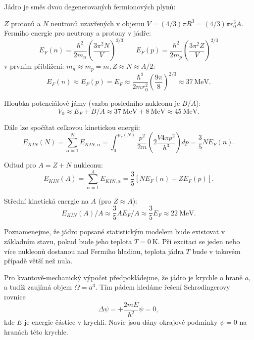\documentclass[../../main.tex]{subfiles}
\begin{document}
Jádro je směs dvou degenerovaných fermionových plynů:

$Z$ protonů a $N$ neutronů uzavřených v objemu $V = (4/3) \pi R^3 = (4/3) \pi r_0 ^3 A$. Fermiho energie pro neutrony a protony v jádře:
\begin{equation}
E_F (n) = \dfrac{\hbar ^2}{2 m_n} \left( \dfrac{3 \pi^2 N}{V}\right)^{2/3} ~~~~~~~~ E_F(p) = \dfrac{\hbar ^2}{2 m_p} \left( \dfrac{3 \pi^2 Z}{V}\right)^{2/3} 
\end{equation}  
v prvním přiblížení: $m_n \approx m_p = m, Z \approx N \approx A/2$:
\begin{equation}
E_F(n) \approx E_F (p) = E_F \approx \dfrac{\hbar ^2 }{2 m r_{0} ^2} \left( \dfrac{9 \pi}{8}\right) ^{2/3} \approx 37 ~\mathrm{MeV} .
\end{equation}

Hloubka potenciálové jámy (vazba posledního nukleonu je $B/A$):
\begin{equation}
V_0 \approx E_F + B/A \approx 37 ~\mathrm{MeV} + 8 ~\mathrm{MeV} \approx 45 ~\mathrm{MeV}.
\end{equation}

Dále lze spočítat celkovou kinetickou energii:
\begin{equation}
E_{KIN} (N) = \sum_{\alpha = 1}^{N} E_{KIN, \alpha} = \int_{0}^{p_F (N)} \dfrac{p^2}{2 m} \left( 2 \dfrac{V 4 \pi p^2}{h^3} \right) dp = \dfrac{3}{5} N E_F (n) .
\end{equation}

Odtud pro $A = Z + N$ nukleonu: 
\begin{equation}
E_{KIN} (A) = \sum_{\alpha = 1}^{A} E_{KIN, \alpha} = \dfrac{3}{5} \left[ N E_F (n) + Z E_F (p) \right] .
\end{equation}

Střední kinetická energie na $A$ (pro $Z \approx A$): 
\begin{equation}
E_{KIN} (A)/A \approx \dfrac{3}{5} A E_F /A  \approx \dfrac{3}{5} E_F \approx 22 ~\mathrm{MeV}.
\end{equation}

Poznamenejme, že jádro popsané statistickým modelem bude existovat v základním stavu, pokud bude jeho teplota $T=0 ~\mathrm{K}$. Při excitaci se jeden nebo více nukleonů dostanou nad Fermiho hladinu, teplota jádra $T$ bude v takovém případě větší než nula. 

Pro kvantově-mechanický výpočet předpokládejme, že jádro je krychle o hraně $a$, a tudíž zaujímá objem $\Omega = a^3$. Tím pádem hledáme řešení Schr$\ddot{o}$dingerovy rovnice
\begin{equation}
\Delta \psi = + \dfrac{2m E}{\hbar ^2} \psi = 0,
\end{equation} 
kde $E$ je energie částice v krychli. Navíc jsou dány okrajové podmínky $\psi = 0$ na hranách této krychle. 
\end{document}
